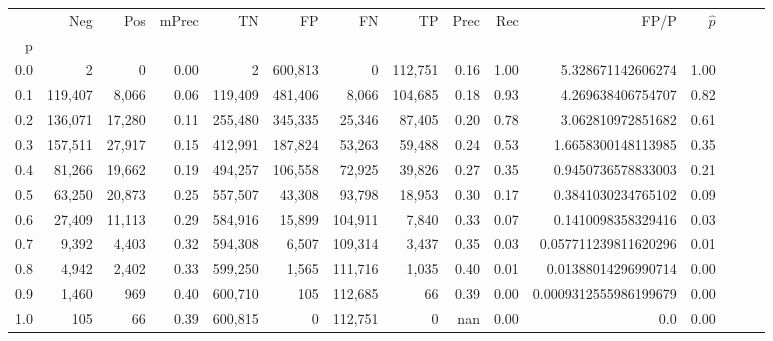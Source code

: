 \begin{tabular}{rrrrrrrrrrrrrrr}
\toprule
{} &      Neg &     Pos & mPrec &       TN &       FP &       FN &       TP &  Prec &   Rec &                   FP/P & $\hat{p}$ \\
p   &          &         &       &          &          &          &          &       &       &                        &           \\
\midrule
0.0 &        2 &       0 &  0.00 &        2 &  600,813 &        0 &  112,751 &  0.16 &  1.00 &      5.328671142606274 &      1.00 \\
0.1 &  119,407 &   8,066 &  0.06 &  119,409 &  481,406 &    8,066 &  104,685 &  0.18 &  0.93 &      4.269638406754707 &      0.82 \\
0.2 &  136,071 &  17,280 &  0.11 &  255,480 &  345,335 &   25,346 &   87,405 &  0.20 &  0.78 &      3.062810972851682 &      0.61 \\
0.3 &  157,511 &  27,917 &  0.15 &  412,991 &  187,824 &   53,263 &   59,488 &  0.24 &  0.53 &     1.6658300148113985 &      0.35 \\
0.4 &   81,266 &  19,662 &  0.19 &  494,257 &  106,558 &   72,925 &   39,826 &  0.27 &  0.35 &     0.9450736578833003 &      0.21 \\
0.5 &   63,250 &  20,873 &  0.25 &  557,507 &   43,308 &   93,798 &   18,953 &  0.30 &  0.17 &     0.3841030234765102 &      0.09 \\
0.6 &   27,409 &  11,113 &  0.29 &  584,916 &   15,899 &  104,911 &    7,840 &  0.33 &  0.07 &     0.1410098358329416 &      0.03 \\
0.7 &    9,392 &   4,403 &  0.32 &  594,308 &    6,507 &  109,314 &    3,437 &  0.35 &  0.03 &   0.057711239811620296 &      0.01 \\
0.8 &    4,942 &   2,402 &  0.33 &  599,250 &    1,565 &  111,716 &    1,035 &  0.40 &  0.01 &    0.01388014296990714 &      0.00 \\
0.9 &    1,460 &     969 &  0.40 &  600,710 &      105 &  112,685 &       66 &  0.39 &  0.00 &  0.0009312555986199679 &      0.00 \\
1.0 &      105 &      66 &  0.39 &  600,815 &        0 &  112,751 &        0 &   nan &  0.00 &                    0.0 &      0.00 \\
\bottomrule
\end{tabular}
